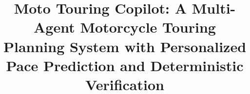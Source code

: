 \documentclass[conference,a4paper]{IEEEtran}
\begin{document}
\title{Moto Touring Copilot: A Multi-Agent Motorcycle Touring Planning System with Personalized Pace Prediction and Deterministic Verification}
\author{
}
\maketitle








\end{document}
